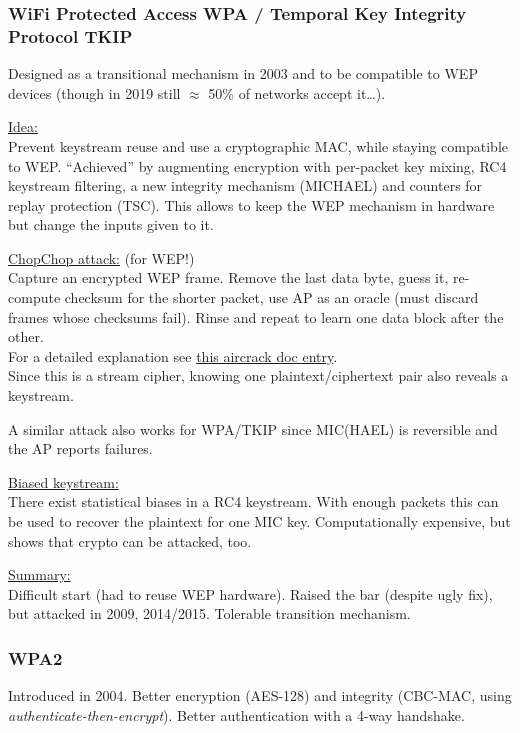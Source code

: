 \subsubsection*{WiFi Protected Access WPA / Temporal Key Integrity Protocol TKIP}

Designed as a transitional mechanism in 2003 and to be compatible to WEP devices (though in 2019 still $\approx$ 50\% of networks accept it\dots).

\underline{Idea:}\\
Prevent keystream reuse and use a cryptographic MAC, while staying compatible to WEP.\@
``Achieved'' by augmenting encryption with per-packet key mixing, RC4 keystream filtering, a new integrity mechanism (MICHAEL) and counters for replay protection (TSC).
This allows to keep the WEP mechanism in hardware but change the inputs given to it.

\underline{ChopChop attack:} (for WEP!) \\
Capture an encrypted WEP frame.
Remove the last data byte, guess it, re-compute checksum for the shorter packet, use AP as an oracle (must discard frames whose checksums fail).
Rinse and repeat to learn one data block after the other.
\\
For a detailed explanation see \href{https://www.aircrack-ng.org/doku.php?id=chopchoptheory}{this aircrack doc entry}.
\\
Since this is a stream cipher, knowing one plaintext/ciphertext pair also reveals a keystream.

A similar attack also works for WPA/TKIP since MIC(HAEL) is reversible and the AP reports failures.

\underline{Biased keystream:} \\
There exist statistical biases in a RC4 keystream.
With enough packets this can be used to recover the plaintext for one MIC key.
Computationally expensive, but shows that crypto can be attacked, too.

\underline{Summary:}\\
Difficult start (had to reuse WEP hardware).
Raised the bar (despite ugly fix), but attacked in 2009, 2014/2015.
Tolerable transition mechanism.


\subsubsection*{WPA2}

Introduced in 2004.
Better encryption (AES-128) and integrity (CBC-MAC, using \textit{authenticate-then-encrypt}).
Better authentication with a 4-way handshake.

